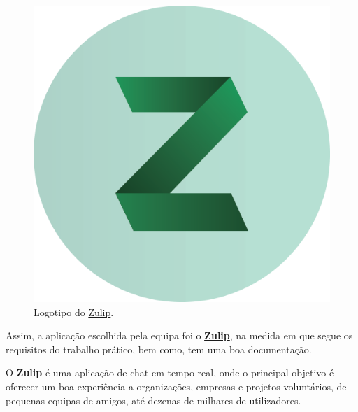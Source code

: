 \begin{figure}[h!]
\centering
\includegraphics[scale=0.30]{images/zulip.png}
\caption{Logotipo do \href{https://zulipchat.com}{Zulip}.}
\label{img:docker}
\end{figure}
\newline

Assim, a aplicação escolhida pela equipa foi o \textbf{\href{https://zulipchat.com}{Zulip}}, na medida em que segue os requisitos do trabalho prático, bem como, tem uma boa documentação.

O \textbf{Zulip} é uma aplicação de chat em tempo real, onde o principal objetivo é oferecer um boa experiência a organizações, empresas e projetos voluntários, de pequenas equipas de amigos, até dezenas de milhares de utilizadores.\\
